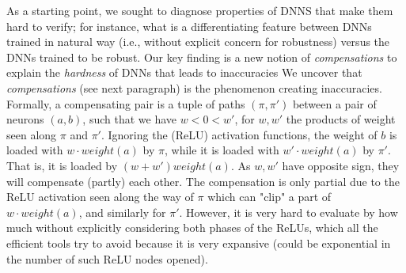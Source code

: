 As a starting point, we sought to diagnose properties of DNNS that make them hard to verify; for instance, what is a differentiating  feature between DNNs trained in natural way (i.e., without explicit concern for robustness) versus the DNNs trained to be robust. Our key finding is a new notion of {\em compensations} to explain the {\em hardness} of DNNs that leads to inaccuracies 
We uncover that {\em compensations} 
(see next paragraph) is the phenomenon creating inaccuracies. Formally, a compensating pair is a tuple of paths $(\pi,\pi')$ between a pair of neurons $(a,b)$, such that we have $w < 0 < w'$, for $w,w'$ the products of weight seen along $\pi$ and $\pi'$. Ignoring the (ReLU) activation functions, the weight of $b$ is loaded with $w \cdot weight(a)$ by $\pi$, while it is loaded with $w' \cdot weight(a)$ by $\pi'$. That is, it is loaded by $(w+w') weight(a)$. As $w,w'$ have opposite sign, they will compensate (partly) each other. The compensation is only partial due to the ReLU activation seen along the way of $\pi$ which can "clip" a part of $w \cdot weight(a)$, and similarly for $\pi'$. However, it is very hard to evaluate by how much without explicitly considering both phases of the ReLUs, which all the efficient tools try to avoid because it is very expansive (could be exponential in the number of such ReLU nodes opened).


